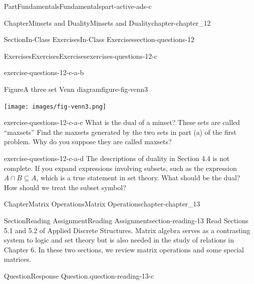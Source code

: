 \documentclass[oneside,10pt,]{book}
\numberwithin{equation}{section}
\begin{document}
\begin{partptx}{Part}{Fundamentals}{}{Fundamentals}{}{}{part-active-ads-c}
\begin{chapterptx}{Chapter}{Minsets and Duality}{}{Minsets and Duality}{}{}{chapter-chapter_12}
\begin{sectionptx}{Section}{In-Class Exercises}{}{In-Class Exercises}{}{}{section-questions-12}
\begin{exercises-subsection-numberless}{Exercises}{Exercises}{}{Exercises}{}{}{exercises-questions-12-c}
\begin{exercisegroup}
\begin{divisionexerciseeg}{2}{}{}{exercise-questions-12-c-a-b}
\begin{enumerate}[label=(\alph*)]
\end{enumerate}
%
\begin{figureptx}{Figure}{A three set Venn diagram}{figure-fig-venn3}{}%
\begin{image}{0.05}{0.9}{0.05}{}%
\texttt{[image: images/fig-venn3.png]}
\end{image}%
\tcblower
\end{figureptx}%
\end{divisionexerciseeg}%
\begin{divisionexerciseeg}{3}{}{}{exercise-questions-12-c-a-c}%
What is the dual of a minset?  These sets are called ``maxsets''  Find the maxsets generated by the two sets in part (a) of the first problem.   Why do you suppose they are called maxsets?%
\end{divisionexerciseeg}%
\begin{divisionexerciseeg}{4}{}{}{exercise-questions-12-c-a-d}%
The descriptions of duality in Section 4.4 is not complete.  If you expand expressions involving subsets, such as the expression \(A \cap B \subseteq A\), which is a true statement in set theory.  What should be the dual?  How should we treat the subset symbol?%
\end{divisionexerciseeg}%
\end{exercisegroup}
\par\medskip\noindent
\end{exercises-subsection-numberless}
\end{sectionptx}
\end{chapterptx}
%
\typeout{************************************************}
\typeout{************************************************}
%
\begin{chapterptx}{Chapter}{Matrix Operations}{}{Matrix Operations}{}{}{chapter-chapter_13}
\renewcommand*{\chaptername}{Chapter}
%
%
%
\typeout{************************************************}
\typeout{************************************************}
%
\begin{sectionptx}{Section}{Reading Assignment}{}{Reading Assignment}{}{}{section-reading-13}
Read Sections 5.1 and 5.2 of Applied Discrete Structures. Matrix algebra serves as a contrasting system to logic and set theory but is also needed in the study of relations in Chapter 6.  In these two sections, we review matrix operations and some special matrices.%
\begin{question}{Question}{Response Question.}{question-reading-13-c}%

\end{question}
\end{sectionptx}
\end{chapterptx}
\end{partptx}
\end{document}
